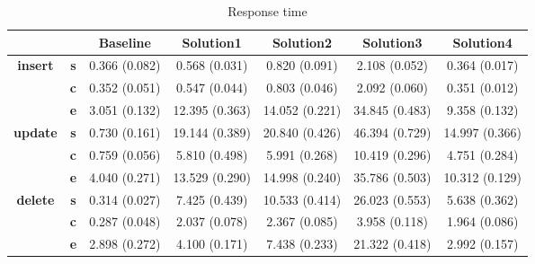 \begin{table}[h]
\centering
\caption{Response time}\label{t:}
\begin{tabular}{ccccccc}
\toprule
&&\textbf{Baseline} & \textbf{Solution1} & \textbf{Solution2} & \textbf{Solution3} & \textbf{Solution4}\\
\midrule
\multirow{3}{*}{\textbf{insert}} & \textbf{s} & 0.366 (0.082) & 0.568 (0.031) & 0.820 (0.091) & 2.108 (0.052) & 0.364 (0.017)\\
 & \textbf{c} & 0.352 (0.051) & 0.547 (0.044) & 0.803 (0.046) & 2.092 (0.060) & 0.351 (0.012)\\
 & \textbf{e} & 3.051 (0.132) & 12.395 (0.363) & 14.052 (0.221) & 34.845 (0.483) & 9.358 (0.132)\\
\midrule
\multirow{3}{*}{\textbf{update}} & \textbf{s} & 0.730 (0.161) & 19.144 (0.389) & 20.840 (0.426) & 46.394 (0.729) & 14.997 (0.366)\\
 & \textbf{c} & 0.759 (0.056) & 5.810 (0.498) & 5.991 (0.268) & 10.419 (0.296) & 4.751 (0.284)\\
 & \textbf{e} & 4.040 (0.271) & 13.529 (0.290) & 14.998 (0.240) & 35.786 (0.503) & 10.312 (0.129)\\
\midrule
\multirow{3}{*}{\textbf{delete}} & \textbf{s} & 0.314 (0.027) & 7.425 (0.439) & 10.533 (0.414) & 26.023 (0.553) & 5.638 (0.362)\\
 & \textbf{c} & 0.287 (0.048) & 2.037 (0.078) & 2.367 (0.085) & 3.958 (0.118) & 1.964 (0.086)\\
 & \textbf{e} & 2.898 (0.272) & 4.100 (0.171) & 7.438 (0.233) & 21.322 (0.418) & 2.992 (0.157)\\
\bottomrule
\end{tabular}
\end{table}




